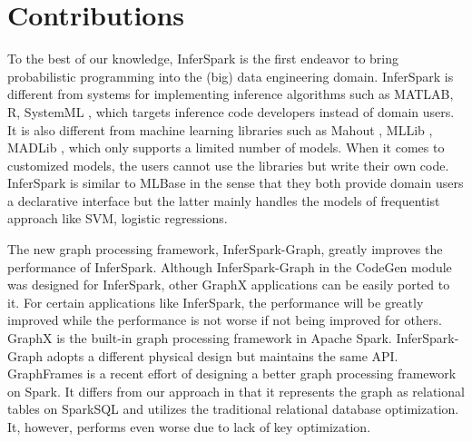 \section{Contributions}

To the best of our knowledge, InferSpark is the first endeavor to bring
probabilistic programming into the (big) data engineering domain.  InferSpark
is different from systems for implementing inference algorithms such as MATLAB,
R, SystemML , which targets inference code developers
instead of domain users.  It is also different from machine learning libraries
such as Mahout , MLLib , MADLib
, which only supports a limited number of models. When it
comes to customized models, the users cannot use the libraries but write their
own code. InferSpark is similar to MLBase  in the sense that
they both provide domain users a declarative interface but the latter mainly
handles the models of frequentist approach like SVM, logistic regressions.

The new graph processing framework, InferSpark-Graph, greatly improves the
performance of InferSpark. Although InferSpark-Graph in the
CodeGen module was designed for InferSpark, other GraphX applications can be
easily ported to it. For certain applications like InferSpark, the
performance will be greatly improved while the performance is not worse if not
being improved for others.  GraphX  is the built-in graph
processing framework in Apache Spark. InferSpark-Graph adopts a different
physical design but maintains the same API.  GraphFrames
 is a recent effort of designing a better graph
processing framework on Spark. It differs from our approach in that it
represents the graph as relational tables on SparkSQL and utilizes the
traditional relational database optimization. It, however, performs even
worse due to lack of key optimization.

